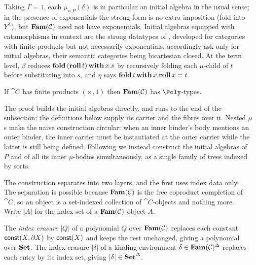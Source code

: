 Taking $\Gamma = 1$, each $\mu_{\alpha.P}(\delta)$ is in particular an initial algebra in the usual
sense; in the presence of exponentials the strong form is no extra imposition (fold into $Y^\Gamma$), but
$\mathbf{Fam}(\mathcal{C})$ need not have exponentials. Initial algebras equipped with catamorphisms in
context are the strong datatypes of \citet{cockett-spencer92}, developed for categories with finite
products but not necessarily exponentials. \citet[Definition~6]{nunes2023} accordingly ask only for
initial algebras, their semantic categories being bicartesian closed. At the term level, $\beta$ reduces
$\mathbf{fold}\,(\mathbf{roll}\,t)\,\mathbf{with}\,x.s$ by recursively folding each $\mu$-child of $t$ before
substituting into $s$, and $\eta$ says $\mathbf{fold}\,t\,\mathbf{with}\,x.\mathbf{roll}\,x = t$.

\begin{proposition}
\label{prop:polynomial-types:fam-has-poly}
If $\cat{C}$ has finite products $(\times, 1)$ then $\mathbf{Fam}(\mathcal{C})$ has $\Poly$-types.
\end{proposition}

The proof builds the initial algebras directly, and runs to the end of the subsection; the
definitions below supply its carrier and the fibres over it. Nested $\mu$s make the naive
construction circular: when an inner binder's body mentions an outer binder,
the inner carrier must be instantiated at the outer carrier while the latter is still being defined.
Following \citet{abbott2004} we instead construct the initial algebras of $P$ and of all its inner
$\mu$-bodies simultaneously, as a single family of trees indexed by sorts.

The construction separates into two layers, and the first uses index data only. The separation
is possible because $\mathbf{Fam}(\mathcal{C})$ is the free coproduct completion of $\cat{C}$, so an object is a
set-indexed collection of $\cat{C}$-objects and nothing more. Write $|A|$ for the
index set of a $\mathbf{Fam}(\mathcal{C})$-object $A$.

\begin{definition}
\label{def:polynomial-types:erasure}
The \emph{index erasure} $|Q|$ of a polynomial $Q$ over $\mathbf{Fam}(\mathcal{C})$ replaces each constant
$\mathsf{const}(X, \partial X)$ by $\mathsf{const}(X)$ and keeps the rest unchanged, giving a polynomial over
$\mathbf{Set}$. The index erasure $|\delta|$ of a kinding
environment $\delta \in \mathbf{Fam}(\mathcal{C})^\Delta$ replaces each entry by its index set, giving $|\delta|
\in \mathbf{Set}^\Delta$.
\end{definition}

